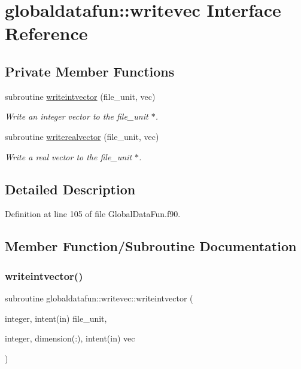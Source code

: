 \hypertarget{interfaceglobaldatafun_1_1writevec}{}\section{globaldatafun\+:\+:writevec Interface Reference}
\label{interfaceglobaldatafun_1_1writevec}
\subsection*{Private Member Functions}
\begin{DoxyCompactItemize}
\item 
subroutine \hyperlink{interfaceglobaldatafun_1_1writevec_acaa8979c629439920cf2fcd8dc39652d}{writeintvector} (file\+\_\+unit, vec)
\begin{DoxyCompactList}\small\item\em Write an integer vector to the file\+\_\+unit $\ast$. \end{DoxyCompactList}\item 
subroutine \hyperlink{interfaceglobaldatafun_1_1writevec_a64fd9ea2d0b1776a2844c65a2e7ffac9}{writerealvector} (file\+\_\+unit, vec)
\begin{DoxyCompactList}\small\item\em Write a real vector to the file\+\_\+unit $\ast$. \end{DoxyCompactList}\end{DoxyCompactItemize}


\subsection{Detailed Description}


Definition at line 105 of file Global\+Data\+Fun.\+f90.



\subsection{Member Function/\+Subroutine Documentation}
\mbox{\label{interfaceglobaldatafun_1_1writevec_acaa8979c629439920cf2fcd8dc39652d}} 
\subsubsection{\texorpdfstring{writeintvector()}{writeintvector()}}
{\footnotesize\ttfamily subroutine globaldatafun\+::writevec\+::writeintvector (\begin{DoxyParamCaption}\item[{integer, intent(in)}]{file\+\_\+unit,  }\item[{integer, dimension(\+:), intent(in)}]{vec }\end{DoxyParamCaption})\hspace{0.3cm}{\ttfamily [private]}}



